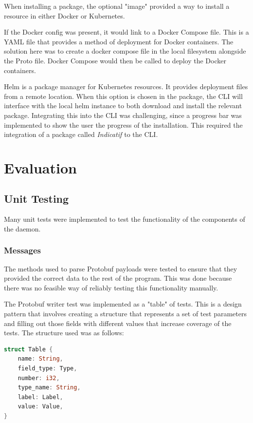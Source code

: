 \documentclass[a4paper,12pt]{report}
\begin{document}
When installing a package, the optional "image" provided a way to install a resource in either Docker or Kubernetes.

If the Docker config was present, it would link to a Docker Compose \cite{compose} file. This is a YAML file that provides a method of deployment for Docker containers. The solution here was to create a docker compose file in the local filesystem alongside the Proto file. Docker Compose would then be called to deploy the Docker containers.

Helm \cite{helm} is a package manager for Kubernetes resources. It provides deployment files from a remote location.
When this option is chosen in the package, the CLI will interface with the local helm instance to both download and install the relevant package.
Integrating this into the CLI was challenging, since a progress bar was implemented to show the user the progress of the installation.
This required the integration of a package called \textit{Indicatif \cite{indicatif}} to the CLI.

\chapter{Evaluation}
\section{Unit Testing}
Many unit tests were implemented to test the functionality of the components of the daemon.

\subsection{Messages}
The \textit{} methods used to parse Protobuf payloads were tested to ensure that they provided the correct
data to the rest of the program. This was done because there was no feasible way of reliably testing this functionality manually.

The Protobuf writer test was implemented as a "table" of tests. This is a design pattern that involves creating a structure that represents a set of test parameters and filling out those fields with different values that increase coverage of the tests.
The structure used was as follows:

\begin{lstlisting}[language=Rust]
struct Table {
    name: String,
    field_type: Type,
    number: i32,
    type_name: String,
    label: Label,
    value: Value,
}
\end{lstlisting}
\end{document}
